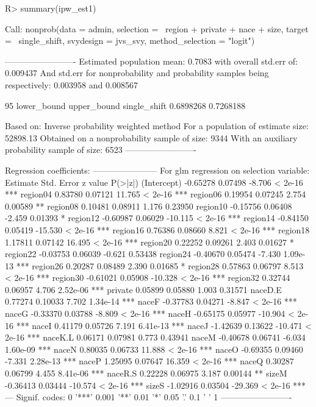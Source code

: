 \documentclass[
]{jss}
\begin{document}
\begin{CodeChunk}
\begin{CodeInput}
R> summary(ipw_est1)
\end{CodeInput}
\begin{CodeOutput}

Call:
nonprob(data = admin, selection = ~region + private + nace + 
    size, target = ~single_shift, svydesign = jvs_svy, method_selection = "logit")

-------------------------
Estimated population mean: 0.7083 with overall std.err of: 0.009437
And std.err for nonprobability and probability samples being respectively:
0.003958 and 0.008567

95%
             lower_bound upper_bound
single_shift   0.6898268   0.7268188


Based on: Inverse probability weighted method
For a population of estimate size: 52898.13
Obtained on a nonprobability sample of size: 9344
With an auxiliary probability sample of size: 6523
-------------------------

Regression coefficients:
-----------------------
For glm regression on selection variable:
            Estimate Std. Error z value  P(>|z|)    
(Intercept) -0.65278    0.07498  -8.706  < 2e-16 ***
region04     0.83780    0.07121  11.765  < 2e-16 ***
region06     0.19954    0.07245   2.754  0.00589 ** 
region08     0.10481    0.08911   1.176  0.23950    
region10    -0.15756    0.06408  -2.459  0.01393 *  
region12    -0.60987    0.06029 -10.115  < 2e-16 ***
region14    -0.84150    0.05419 -15.530  < 2e-16 ***
region16     0.76386    0.08660   8.821  < 2e-16 ***
region18     1.17811    0.07142  16.495  < 2e-16 ***
region20     0.22252    0.09261   2.403  0.01627 *  
region22    -0.03753    0.06039  -0.621  0.53438    
region24    -0.40670    0.05474  -7.430 1.09e-13 ***
region26     0.20287    0.08489   2.390  0.01685 *  
region28     0.57863    0.06797   8.513  < 2e-16 ***
region30    -0.61021    0.05908 -10.328  < 2e-16 ***
region32     0.32744    0.06957   4.706 2.52e-06 ***
private      0.05899    0.05880   1.003  0.31571    
naceD.E      0.77274    0.10033   7.702 1.34e-14 ***
naceF       -0.37783    0.04271  -8.847  < 2e-16 ***
naceG       -0.33370    0.03788  -8.809  < 2e-16 ***
naceH       -0.65175    0.05977 -10.904  < 2e-16 ***
naceI        0.41179    0.05726   7.191 6.41e-13 ***
naceJ       -1.42639    0.13622 -10.471  < 2e-16 ***
naceK.L      0.06171    0.07981   0.773  0.43941    
naceM       -0.40678    0.06741  -6.034 1.60e-09 ***
naceN        0.80035    0.06733  11.888  < 2e-16 ***
naceO       -0.69355    0.09460  -7.331 2.28e-13 ***
naceP        1.25095    0.07647  16.359  < 2e-16 ***
naceQ        0.30287    0.06799   4.455 8.41e-06 ***
naceR.S      0.22228    0.06975   3.187  0.00144 ** 
sizeM       -0.36413    0.03444 -10.574  < 2e-16 ***
sizeS       -1.02916    0.03504 -29.369  < 2e-16 ***
---
Signif. codes:  0 '***' 0.001 '**' 0.01 '*' 0.05 '.' 0.1 ' ' 1
-------------------------


\end{CodeOutput}
\end{CodeChunk}
\end{document}
